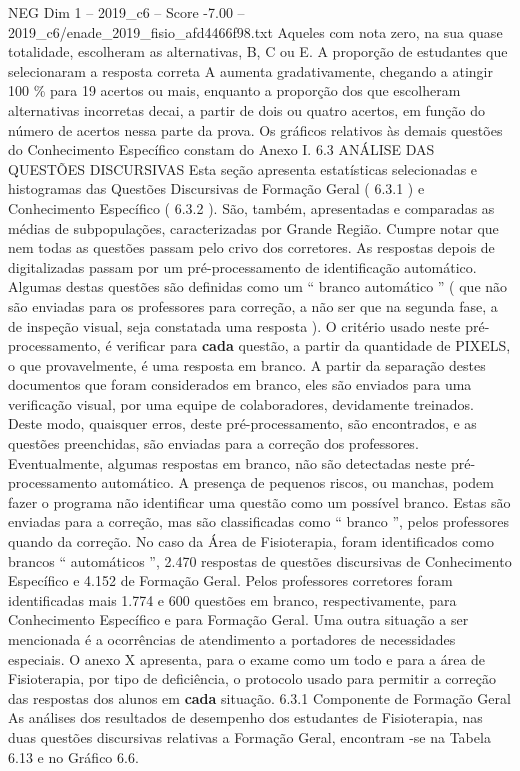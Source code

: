 \begin{textsample}{NEG Dim 1 – 2019\_c6 – Score -7.00 – 2019\_c6/enade\_2019\_fisio\_afd4466f98.txt}
Aqueles com nota zero, na sua quase totalidade, escolheram as alternativas, B, C ou E.
A proporção de estudantes que selecionaram a resposta correta A aumenta gradativamente, chegando a atingir 100 \% para 19 acertos ou mais, enquanto a proporção dos que escolheram alternativas incorretas decai, a partir de dois ou quatro acertos, em função do número de acertos nessa parte da prova.
Os gráficos relativos às demais questões do Conhecimento Específico constam do Anexo I. 6.3 ANÁLISE DAS QUESTÕES DISCURSIVAS Esta seção apresenta estatísticas selecionadas e histogramas das Questões Discursivas de Formação Geral ( 6.3.1 ) e Conhecimento Específico ( 6.3.2 ).
São, também, apresentadas e comparadas as médias de subpopulações, caracterizadas por Grande Região.
Cumpre notar que nem todas as questões passam pelo crivo dos corretores.
As respostas depois de digitalizadas passam por um pré-processamento de identificação automático.
Algumas destas questões são definidas como um “ branco automático ” ( que não são enviadas para os professores para correção, a não ser que na segunda fase, a de inspeção visual, seja constatada uma resposta ).
O critério usado neste pré-processamento, é verificar para \textbf{cada} questão, a partir da quantidade de PIXELS, o que provavelmente, é uma resposta em branco.
A partir da separação destes documentos que foram considerados em branco, eles são enviados para uma verificação visual, por uma equipe de colaboradores, devidamente treinados.
Deste modo, quaisquer erros, deste pré-processamento, são encontrados, e as questões preenchidas, são enviadas para a correção dos professores.
Eventualmente, algumas respostas em branco, não são detectadas neste pré-processamento automático.
A presença de pequenos riscos, ou manchas, podem fazer o programa não identificar uma questão como um possível branco.
Estas são enviadas para a correção, mas são classificadas como “ branco ”, pelos professores quando da correção.
No caso da Área de Fisioterapia, foram identificados como brancos “ automáticos ”, 2.470 respostas de questões discursivas de Conhecimento Específico e 4.152 de Formação Geral.
Pelos professores corretores foram identificadas mais 1.774 e 600 questões em branco, respectivamente, para Conhecimento Específico e para Formação Geral.
Uma outra situação a ser mencionada é a ocorrências de atendimento a portadores de necessidades especiais.
O anexo X apresenta, para o exame como um todo e para a área de Fisioterapia, por tipo de deficiência, o protocolo usado para permitir a correção das respostas dos alunos em \textbf{cada} situação. 6.3.1 Componente de Formação Geral As análises dos resultados de desempenho dos estudantes de Fisioterapia, nas duas questões discursivas relativas a Formação Geral, encontram -se na Tabela 6.13 e no Gráfico 6.6.

\end{textsample}
